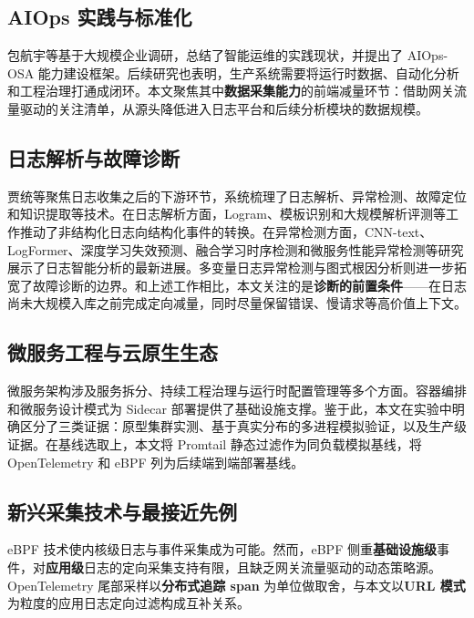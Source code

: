 \subsection{AIOps 实践与标准化}
包航宇等\cite{bao2023aiops}基于大规模企业调研，总结了智能运维的实践现状，并提出了 AIOps-OSA 能力建设框架。后续研究也表明，生产系统需要将运行时数据、自动化分析和工程治理打通成闭环\cite{cheng2023aiops,diaz2023mlopsaiops,moreschini2023microai}。本文聚焦其中\textbf{数据采集能力}的前端减量环节：借助网关流量驱动的关注清单，从源头降低进入日志平台和后续分析模块的数据规模。

\subsection{日志解析与故障诊断}
贾统等\cite{jiatong2020logdiag}聚焦日志收集之后的下游环节，系统梳理了日志解析、异常检测、故障定位和知识提取等技术。在日志解析方面，Logram、模板识别和大规模解析评测等工作推动了非结构化日志向结构化事件的转换\cite{dai2020logram,khan2022logtemplate,jiang2023logparsing}。在异常检测方面，CNN-text、LogFormer、深度学习失效预测、融合学习时序检测和微服务性能异常检测等研究展示了日志智能分析的最新进展\cite{meiyudong2020logcnn,guo2024logformer,ali2025logml,hadadi2024logfailure,zhou2023fusionad,fang2024microperf,zhang2024reducing}。多变量日志异常检测与图式根因分析则进一步拓宽了故障诊断的边界\cite{zhang2024multivariate,soldani2020graphrca}。和上述工作相比，本文关注的是\textbf{诊断的前置条件}——在日志尚未大规模入库之前完成定向减量，同时尽量保留错误、慢请求等高价值上下文。

\subsection{微服务工程与云原生生态}
微服务架构涉及服务拆分、持续工程治理与运行时配置管理等多个方面\cite{ding2020decomposition,jia2021loggingdecision,jamshidi2018microservices,seshagiri2022sok}。容器编排和微服务设计模式为 Sidecar 部署提供了基础设施支撑\cite{burns2016patterns,burns2016borg,richardson2018microservices}。鉴于此，本文在实验中明确区分了三类证据：原型集群实测、基于真实分布的多进程模拟验证，以及生产级证据。在基线选取上，本文将 Promtail 静态过滤作为同负载模拟基线，将 OpenTelemetry 和 eBPF 列为后续端到端部署基线。

\subsection{新兴采集技术与最接近先例}
eBPF 技术使内核级日志与事件采集成为可能\cite{soldani2023ebpf,yang2023nahida}。然而，eBPF 侧重\textbf{基础设施级}事件，对\textbf{应用级}日志的定向采集支持有限，且缺乏网关流量驱动的动态策略源。OpenTelemetry 尾部采样以\textbf{分布式追踪 span} 为单位做取舍，与本文以\textbf{URL 模式}为粒度的应用日志定向过滤构成互补关系。

